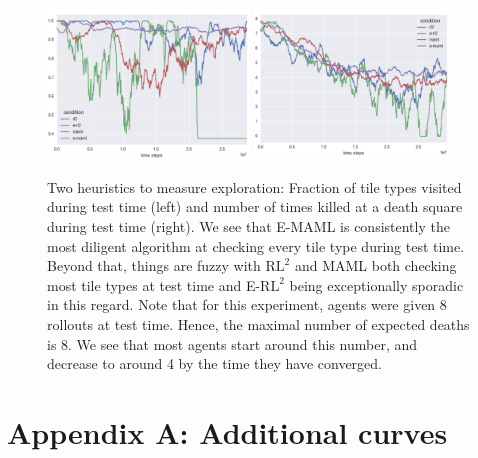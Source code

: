 \documentclass{article} %
\begin{document}
\begin{figure}[H]
\begin{center}
\includegraphics[height=40mm]{bradly_curves/tile_types.png}\hfill
\includegraphics[height=40mm]{bradly_curves/times_visited_death.png}
\end{center}
\caption{Two heuristics to measure exploration: Fraction of tile types visited during test time (left) and number of times killed at a death square during test time (right). We see that E-MAML is consistently the most diligent algorithm at checking every tile type during test time. Beyond that, things are fuzzy with $\text{RL}^2$ and MAML both checking most tile types at test time and E-$\text{RL}^2$ being exceptionally sporadic in this regard. Note that for this experiment, agents were given 8 rollouts at test time. Hence, the maximal number of expected deaths is 8. We see that most agents start around this number, and decrease to around 4 by the time they have converged.}
\label{fig:hs}
\end{figure} 


\newpage




\newpage


\section{Appendix A: Additional curves}
\end{document}

